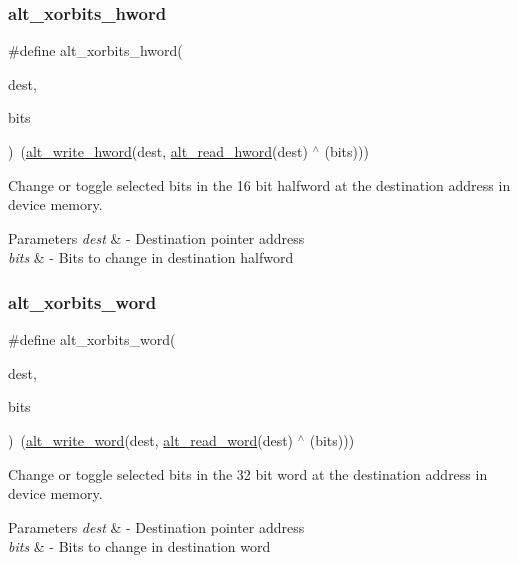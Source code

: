 \subsubsection{\texorpdfstring{alt\_xorbits\_hword}{alt\_xorbits\_hword}}
{\footnotesize\ttfamily \#define alt\+\_\+xorbits\+\_\+hword(\begin{DoxyParamCaption}\item[{}]{dest,  }\item[{}]{bits }\end{DoxyParamCaption})~(\mbox{\hyperlink{group__ALT__SOCAL__UTIL__RW__FUNC_ga68370263143f2bbcae44530837772f50}{alt\+\_\+write\+\_\+hword}}(dest, \mbox{\hyperlink{group__ALT__SOCAL__UTIL__RW__FUNC_gaae69946769b67a9b8bf4f57143b1c4d7}{alt\+\_\+read\+\_\+hword}}(dest) $^\wedge$ (bits)))}

Change or toggle selected bits in the 16 bit halfword at the destination address in device memory. 
\begin{DoxyParams}{Parameters}
{\em dest} & -\/ Destination pointer address \\
\hline
{\em bits} & -\/ Bits to change in destination halfword \\
\hline
\end{DoxyParams}
\mbox{\label{group__ALT__SOCAL__UTIL__SC__FUNC_gad4a68f8f3703e2650e68d3ff4e00ccd9}} 
\subsubsection{\texorpdfstring{alt\_xorbits\_word}{alt\_xorbits\_word}}
{\footnotesize\ttfamily \#define alt\+\_\+xorbits\+\_\+word(\begin{DoxyParamCaption}\item[{}]{dest,  }\item[{}]{bits }\end{DoxyParamCaption})~(\mbox{\hyperlink{group__ALT__SOCAL__UTIL__RW__FUNC_gac135ea12921af3aeb033c92ddb82c66c}{alt\+\_\+write\+\_\+word}}(dest, \mbox{\hyperlink{group__ALT__SOCAL__UTIL__RW__FUNC_ga77db76edef8b90adb75eb837325b5d11}{alt\+\_\+read\+\_\+word}}(dest) $^\wedge$ (bits)))}

Change or toggle selected bits in the 32 bit word at the destination address in device memory. 
\begin{DoxyParams}{Parameters}
{\em dest} & -\/ Destination pointer address \\
\hline
{\em bits} & -\/ Bits to change in destination word \\
\hline
\end{DoxyParams}
